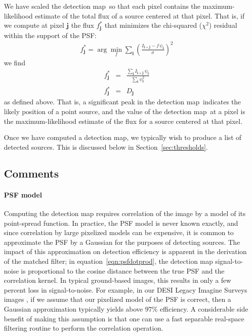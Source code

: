 \documentclass[11pt,letterpaper,linenumbers]{aastex7}
\newcommand{\equationname}{equation}
\newcommand{\eqnref}[1]{\mbox{\equationname~\ref{#1}}}
\newcommand{\secref}[1]{\mbox{Section~\ref{#1}}}
\newcommand{\detmap}{detection map}
\newcommand{\psf}{\psi}
\newcommand{\psfat}[1]{\psf_{#1}}
\renewcommand{\vec}[1]{\boldsymbol{#1}}
\newcommand{\ivec}{\vec{i}}
\newcommand{\jvec}{\vec{j}}
\begin{document}
We have scaled the \detmap\ so that each pixel contains the
maximum-likelihood estimate of the total flux of a source centered
at that pixel.  That is, if we compute at pixel $\jvec$ the flux
$f^{\ast}_{\jvec}$ that minimizes the chi-squared
($\chi^2$) residual within the support of the PSF:
\begin{eqnarray}
  f^{\ast}_{\jvec} = \arg\min_{f} \sum_{\ivec} \left( \frac{I_{\ivec+\jvec} - f \, \psfat{\ivec}}{\sigma} \right)^2
  \nonumber
\end{eqnarray}
we find
\begin{eqnarray}
  f^{\ast}_{\jvec} &=& \frac{\sum_{\ivec} I_{\ivec+\jvec} \, \psfat{\ivec}}{\sum_{\ivec} \psfat{\ivec}^2}
  \nonumber
  \\
  f^{\ast}_{\jvec} &=& D_{\jvec}
  \nonumber
\end{eqnarray}
as defined above.
%
That is, a significant peak in the \detmap\ indicates the likely
position of a point source, and the value of the \detmap\ at a pixel
is the maximum-likelihood estimate of the flux for a source centered
at that pixel.


Once we have computed a detection map, we typically wish to produce a
list of detected sources.  This is discussed below in \secref{sec:thresholds}.


\subsection{Comments}
\label{sec:detectioncomments}

\paragraph{PSF model}
Computing the detection map requires correlation of the image by a
model of its point-spread function.  In practice, the PSF model is
never known exactly, and since correlation by large pixelized models
can be expensive, it is common to approximate the PSF by a Gaussian
for the purposes of detecting sources.  The impact of this
approximation on detection efficiency is apparent in the derivation of
the matched filter; in \eqnref{eqn:psfdotprod}, the detection
map signal-to-noise is proportional to the cosine distance between the
true PSF and the correlation kernel.  In typical ground-based images,
this results in only a few percent loss in signal-to-noise.  For
example, in our DESI Legacy Imagine Surveys images \citep{lsoverview},
if we assume that our pixelized model of the PSF is correct, then a
Gaussian approximation typically yields above $97\%$ efficiency.  A
considerable side benefit of making this assumption is that one can
use a fast separable real-space filtering routine to perform the
correlation operation.
\end{document}
